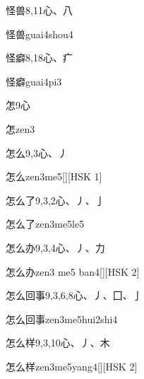 \begin{entry}{怪兽}{8,11}{⼼、⼋}
  \begin{phonetics}{怪兽}{guai4shou4}
  \end{phonetics}
\end{entry}

\begin{entry}{怪癖}{8,18}{⼼、⽧}
  \begin{phonetics}{怪癖}{guai4pi3}
  \end{phonetics}
\end{entry}

\begin{entry}{怎}{9}{⼼}
  \begin{phonetics}{怎}{zen3}
  \end{phonetics}
\end{entry}

\begin{entry}{怎么}{9,3}{⼼、⼃}
  \begin{phonetics}{怎么}{zen3me5}[][HSK 1]
  \end{phonetics}
\end{entry}

\begin{entry}{怎么了}{9,3,2}{⼼、⼃、⼅}
  \begin{phonetics}{怎么了}{zen3me5le5}
  \end{phonetics}
\end{entry}

\begin{entry}{怎么办}{9,3,4}{⼼、⼃、⼒}
  \begin{phonetics}{怎么办}{zen3 me5 ban4}[][HSK 2]
  \end{phonetics}
\end{entry}

\begin{entry}{怎么回事}{9,3,6,8}{⼼、⼃、⼞、⼅}
  \begin{phonetics}{怎么回事}{zen3me5hui2shi4}
  \end{phonetics}
\end{entry}

\begin{entry}{怎么样}{9,3,10}{⼼、⼃、⽊}
  \begin{phonetics}{怎么样}{zen3me5yang4}[][HSK 2]
  \end{phonetics}
\end{entry}

